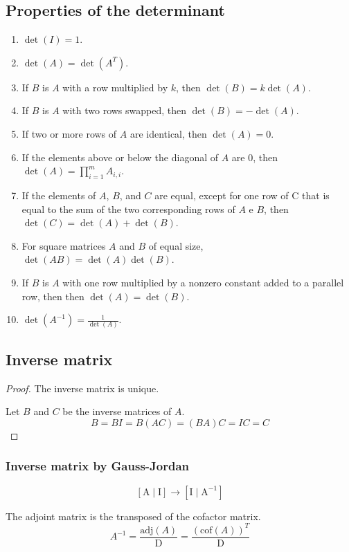 \documentclass[oneside]{book} %
\theoremstyle{plain}
\begin{document}
\subsection{Properties of the determinant}
\begin{enumerate}
\item{$\det(I)=1$.}
\item{$\det(A)=\det(A^{T})$.}
\item{If $B$ is $A$ with a row multiplied by $k$, then $\det(B)=k\det(A)$.}
\item{If $B$ is $A$ with two rows swapped, then $\det(B)=-\det(A)$.}
\item{If two or more rows of $A$ are identical, then $\det(A)=0$.}
\item{If the elements above or below the diagonal of $A$ are $0$, then
$\det(A)=\prod_{i=1}^{m}{A_{i,i}}$.}
\item{If the elements of $A$, $B$, and $C$ are equal,
      except for one row of C that is equal to the sum of the two corresponding
rows of $A$ e $B$,
      then $\det{\left(C\right)}=\det{\left(A\right)}+\det{\left(B\right)}$.}
\item{For square matrices $A$ and $B$ of equal size,
      $\det{\left(AB\right)}=\det{\left(A\right)}\det{\left(B\right)}$.}
\item{If $B$ is $A$ with one row multiplied by a nonzero constant added to a
parallel row, then then $\det(A)=\det(B)$.}
\item{$\det{\left(A^{-1}\right)}=\frac{1}{\det{\left(A\right)}}$.}
\end{enumerate}

\subsection{Inverse matrix}

\begin{proof}
The inverse matrix is unique.

Let $B$ and $C$ be the inverse matrices of $A$.
$$B = BI = B(AC) = (BA)C = IC = C$$
\end{proof}

\subsubsection{Inverse matrix by Gauss-Jordan}
$$ \left[\mathrm{A} \mid \mathrm{I} \right] \rightarrow
\left[\mathrm{I} \mid \mathrm{A} ^ {-1} \right] $$

The adjoint matrix is the transposed of the cofactor matrix.
$$A^{-1} = \frac{\mathrm{adj}(A)}{\mathrm{D}} =
\frac{(\mathrm{cof}(A))^{T}}{\mathrm{D}}$$
\end{document}
